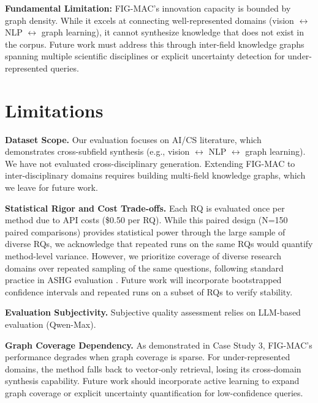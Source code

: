 \documentclass[runningheads]{llncs}
\begin{document}
\textbf{Fundamental Limitation:} FIG-MAC's innovation capacity is bounded by graph density. While it excels at connecting well-represented domains (vision $\leftrightarrow$ NLP $\leftrightarrow$ graph learning), it cannot synthesize knowledge that does not exist in the corpus. Future work must address this through inter-field knowledge graphs spanning multiple scientific disciplines or explicit uncertainty detection for under-represented queries.


\section{Limitations}
\label{sec:limitations}

\textbf{Dataset Scope.} Our evaluation focuses on AI/CS literature, which demonstrates cross-subfield synthesis (e.g., vision $\leftrightarrow$ NLP $\leftrightarrow$ graph learning). We have not evaluated cross-disciplinary generation. Extending FIG-MAC to inter-disciplinary domains requires building multi-field knowledge graphs, which we leave for future work.

\textbf{Statistical Rigor and Cost Trade-offs.} Each RQ is evaluated once per method due to API costs (\$0.50 per RQ). While this paired design (N=150 paired comparisons) provides statistical power through the large sample of diverse RQs, we acknowledge that repeated runs on the same RQs would quantify method-level variance. However, we prioritize coverage of diverse research domains over repeated sampling of the same questions, following standard practice in ASHG evaluation
\cite{DBLP:journals/corr/abs-2408-06292,li2024chain}. Future work will incorporate bootstrapped confidence intervals and repeated runs on a subset of RQs to verify stability.

\textbf{Evaluation Subjectivity.} Subjective quality assessment relies on LLM-based evaluation (Qwen-Max). 

\textbf{Graph Coverage Dependency.} As demonstrated in Case Study 3, FIG-MAC's performance degrades when graph coverage is sparse. For under-represented domains, the method falls back to vector-only retrieval, losing its cross-domain synthesis capability. Future work should incorporate active learning to expand graph coverage or explicit uncertainty quantification for low-confidence queries.
\end{document}
